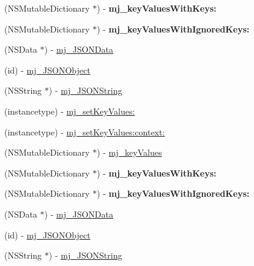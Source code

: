 \begin{DoxyCompactItemize}
\item 
\mbox{\label{category_n_s_object_07_m_j_key_value_08_a429382778a8e55e4b5be5e67b8d57ce5}} 
(N\+S\+Mutable\+Dictionary $\ast$) -\/ {\bfseries mj\+\_\+key\+Values\+With\+Keys\+:}
\item 
\mbox{\label{category_n_s_object_07_m_j_key_value_08_a1e675df8484f47e37f7fdb7df621d5bd}} 
(N\+S\+Mutable\+Dictionary $\ast$) -\/ {\bfseries mj\+\_\+key\+Values\+With\+Ignored\+Keys\+:}
\item 
(N\+S\+Data $\ast$) -\/ \mbox{\hyperlink{category_n_s_object_07_m_j_key_value_08_a063cb2ca185ff6dd4ee655b9e0a07b8e}{mj\+\_\+\+J\+S\+O\+N\+Data}}
\item 
(id) -\/ \mbox{\hyperlink{category_n_s_object_07_m_j_key_value_08_ae6cd431bdbb0349d925f5e223c3ee896}{mj\+\_\+\+J\+S\+O\+N\+Object}}
\item 
(N\+S\+String $\ast$) -\/ \mbox{\hyperlink{category_n_s_object_07_m_j_key_value_08_ad81e02437d4c6c91cedb4673d3f1ecd6}{mj\+\_\+\+J\+S\+O\+N\+String}}
\item 
(instancetype) -\/ \mbox{\hyperlink{category_n_s_object_07_m_j_key_value_08_a2fc0cfd1fdcccf821c9c2d6552c98fb4}{mj\+\_\+set\+Key\+Values\+:}}
\item 
(instancetype) -\/ \mbox{\hyperlink{category_n_s_object_07_m_j_key_value_08_a78ba4bcf5f9bda89ddb88fcb31fb4053}{mj\+\_\+set\+Key\+Values\+:context\+:}}
\item 
(N\+S\+Mutable\+Dictionary $\ast$) -\/ \mbox{\hyperlink{category_n_s_object_07_m_j_key_value_08_af680df47720adec3697184f8d81044e1}{mj\+\_\+key\+Values}}
\item 
\mbox{\label{category_n_s_object_07_m_j_key_value_08_a429382778a8e55e4b5be5e67b8d57ce5}} 
(N\+S\+Mutable\+Dictionary $\ast$) -\/ {\bfseries mj\+\_\+key\+Values\+With\+Keys\+:}
\item 
\mbox{\label{category_n_s_object_07_m_j_key_value_08_a1e675df8484f47e37f7fdb7df621d5bd}} 
(N\+S\+Mutable\+Dictionary $\ast$) -\/ {\bfseries mj\+\_\+key\+Values\+With\+Ignored\+Keys\+:}
\item 
(N\+S\+Data $\ast$) -\/ \mbox{\hyperlink{category_n_s_object_07_m_j_key_value_08_a063cb2ca185ff6dd4ee655b9e0a07b8e}{mj\+\_\+\+J\+S\+O\+N\+Data}}
\item 
(id) -\/ \mbox{\hyperlink{category_n_s_object_07_m_j_key_value_08_ae6cd431bdbb0349d925f5e223c3ee896}{mj\+\_\+\+J\+S\+O\+N\+Object}}
\item 
(N\+S\+String $\ast$) -\/ \mbox{\hyperlink{category_n_s_object_07_m_j_key_value_08_ad81e02437d4c6c91cedb4673d3f1ecd6}{mj\+\_\+\+J\+S\+O\+N\+String}}
\end{DoxyCompactItemize}
